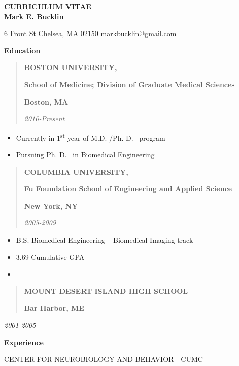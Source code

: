 
\thispagestyle{empty} 

\begin{center} {\LARGE {\bf CURRICULUM VITAE}}\\ \vspace{0.5in} {\large {\bf Mark E.
			Bucklin}}
\end{center}

6 Front St Chelsea, MA 02150 markbucklin@gmail.com 

\textbf{Education} 

\begin{quote}
	\textbf{BOSTON UNIVERSITY,} 

	\textbf{School of Medicine;
		Division of Graduate Medical Sciences} 

	\textbf{Boston, MA} 

	\emph{2010-Present}
\end{quote}

\begin{itemize}
	\item Currently in 1\textsuperscript{st} year of M.D.
	      /Ph.
	      D.
	      ~program
	\item
	      Pursuing Ph.
	      D.
	      ~in Biomedical Engineering
\end{itemize}

\begin{quote}
	\textbf{
		COLUMBIA UNIVERSITY,} 

	\textbf{Fu Foundation School of Engineering and Applied Science} 

	\textbf{New York, NY} 

	\emph{2005-2009}
\end{quote}

\begin{itemize}
	\item B.S.
	      Biomedical Engineering -- Biomedical Imaging track
	\item 3.69 Cumulative GPA
	\item
\end{itemize}

\begin{quote}
	\textbf{MOUNT DESERT ISLAND HIGH SCHOOL} 

	\textbf{Bar Harbor, ME}
\end{quote}

\emph{2001-2005} 

\textbf{Experience} 

CENTER FOR NEUROBIOLOGY AND BEHAVIOR - CUMC 

